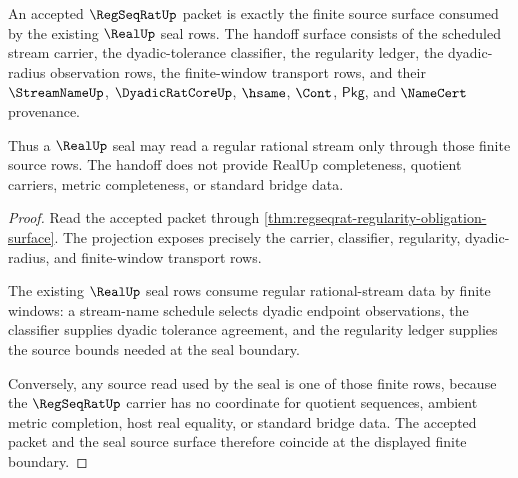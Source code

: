 \begin{theorem}
\label{thm:regseqrat-real-seal-handoff}
An accepted $\RegSeqRatUp$ packet is exactly the finite source surface consumed by the existing $\RealUp$ seal rows. The handoff surface consists of the scheduled stream carrier, the dyadic-tolerance classifier, the regularity ledger, the dyadic-radius observation rows, the finite-window transport rows, and their $\StreamNameUp$, $\DyadicRatCoreUp$, $\hsame$, $\Cont$, $\mathsf{Pkg}$, and $\NameCert$ provenance.

Thus a $\RealUp$ seal may read a regular rational stream only through those finite source rows. The handoff does not provide RealUp completeness, quotient carriers, metric completeness, or standard bridge data.
\end{theorem}
\begin{proof}
Read the accepted packet through \autoref{thm:regseqrat-regularity-obligation-surface}. The projection exposes precisely the carrier, classifier, regularity, dyadic-radius, and finite-window transport rows.

The existing $\RealUp$ seal rows consume regular rational-stream data by finite windows: a stream-name schedule selects dyadic endpoint observations, the classifier supplies dyadic tolerance agreement, and the regularity ledger supplies the source bounds needed at the seal boundary.

Conversely, any source read used by the seal is one of those finite rows, because the $\RegSeqRatUp$ carrier has no coordinate for quotient sequences, ambient metric completion, host real equality, or standard bridge data. The accepted packet and the seal source surface therefore coincide at the displayed finite boundary.
\end{proof}

